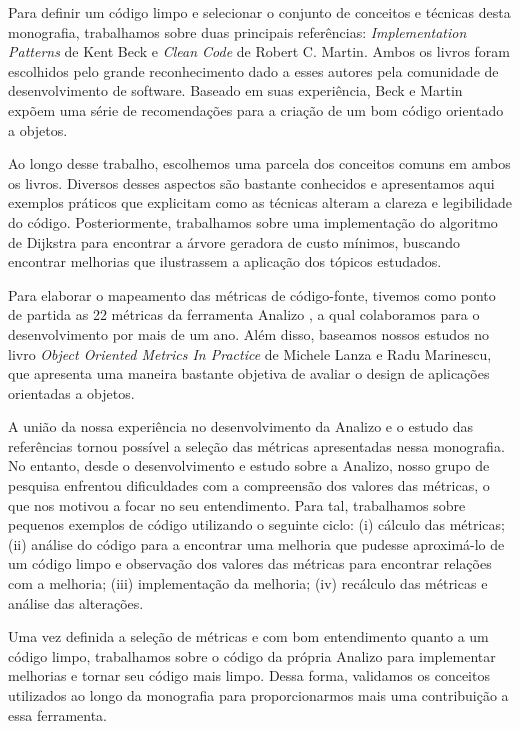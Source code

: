 Para definir um código limpo e selecionar o conjunto de conceitos e técnicas desta monografia, trabalhamos sobre duas principais referências:
\textit{Implementation Patterns} \citep{Beck2007} de Kent Beck e \textit{Clean Code} \citep{Martin2008} de Robert C. Martin. Ambos os livros foram 
escolhidos pelo grande reconhecimento dado a esses autores pela comunidade de desenvolvimento de software. Baseado em suas experiência, Beck e 
Martin expõem uma série de recomendações para a criação de um bom código orientado a objetos.

Ao longo desse trabalho, escolhemos uma parcela dos conceitos comuns em ambos os livros. Diversos desses aspectos são bastante
conhecidos e apresentamos aqui exemplos práticos que explicitam como as técnicas alteram a clareza e legibilidade do código. Posteriormente, 
trabalhamos sobre uma implementação do algoritmo de Dijkstra para encontrar a árvore geradora de
custo mínimos, buscando encontrar melhorias que ilustrassem a aplicação dos tópicos estudados.

Para elaborar o mapeamento das métricas de código-fonte, tivemos como ponto de
partida as 22 métricas da ferramenta Analizo \citep{analizo2010}, a qual colaboramos para o desenvolvimento por mais de um ano.
Além disso, baseamos nossos estudos no livro \textit{Object Oriented Metrics In Practice} \citep{Lanza06} de Michele Lanza e Radu Marinescu, que 
apresenta uma maneira bastante objetiva de avaliar o design de aplicações orientadas a objetos.

A união da nossa experiência no desenvolvimento da Analizo e o estudo das referências
tornou possível a seleção das métricas apresentadas nessa monografia. No entanto, desde o desenvolvimento e estudo sobre a Analizo, nosso grupo
de pesquisa enfrentou dificuldades com a compreensão dos valores das métricas, o que nos motivou a focar no seu entendimento. Para tal,
trabalhamos sobre pequenos exemplos de código utilizando o seguinte ciclo: (i) cálculo das métricas; (ii) análise do código para a encontrar uma 
melhoria que pudesse aproximá-lo de um código limpo e observação dos valores das métricas para encontrar relações com a melhoria; (iii) 
implementação da melhoria; (iv) recálculo das métricas e análise das alterações.

Uma vez definida a seleção de métricas e com bom entendimento quanto a um código limpo, trabalhamos sobre o código da própria Analizo para 
implementar melhorias e tornar seu código mais limpo. Dessa forma, validamos os conceitos utilizados ao longo da monografia para proporcionarmos 
mais uma contribuição a essa ferramenta.

